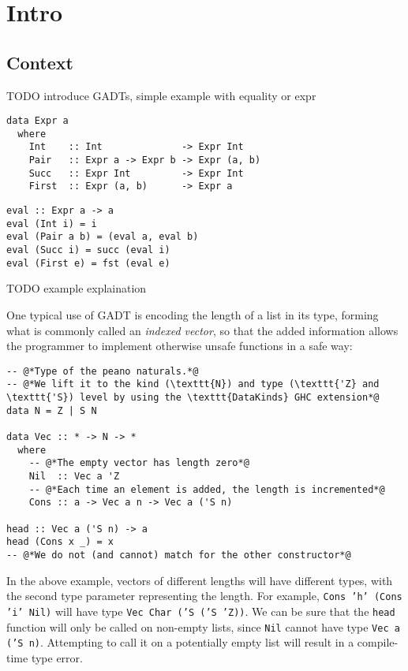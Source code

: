 \chapter{Intro}
\label{cha:intro}

\section{Context}
\label{sec:context}

TODO introduce GADTs, simple example with equality or expr

\begin{lstlisting}[caption=A GADT describing a simple language with ints and pairs]
data Expr a
  where
    Int    :: Int              -> Expr Int
    Pair   :: Expr a -> Expr b -> Expr (a, b)
    Succ   :: Expr Int         -> Expr Int
    First  :: Expr (a, b)      -> Expr a
\end{lstlisting}

\begin{lstlisting}[caption=Evaluator for \texttt{Expr}]
eval :: Expr a -> a
eval (Int i) = i
eval (Pair a b) = (eval a, eval b)
eval (Succ i) = succ (eval i)
eval (First e) = fst (eval e)
\end{lstlisting}

TODO example explaination

One typical use of GADT is encoding the length of a list in its type, forming what is commonly called an \emph{indexed vector}, so that the added information allows the programmer to implement otherwise unsafe functions in a safe way:

\begin{lstlisting}[caption=A length-indexed vector]
-- @*Type of the peano naturals.*@
-- @*We lift it to the kind (\texttt{N}) and type (\texttt{'Z} and \texttt{'S}) level by using the \texttt{DataKinds} GHC extension*@
data N = Z | S N

data Vec :: * -> N -> *
  where
    -- @*The empty vector has length zero*@
    Nil  :: Vec a 'Z
    -- @*Each time an element is added, the length is incremented*@
    Cons :: a -> Vec a n -> Vec a ('S n)

head :: Vec a ('S n) -> a
head (Cons x _) = x
-- @*We do not (and cannot) match for the other constructor*@
\end{lstlisting}

In the above example, vectors of different lengths will have different types, with the second type parameter representing the length.
For example, \texttt{Cons 'h' (Cons 'i' Nil)} will have type \texttt{Vec Char ('S ('S 'Z))}.
We can be sure that the \texttt{head} function will only be called on non-empty lists, since \texttt{Nil} cannot have type \texttt{Vec a ('S n)}.
Attempting to call it on a potentially empty list will result in a compile-time type error.

